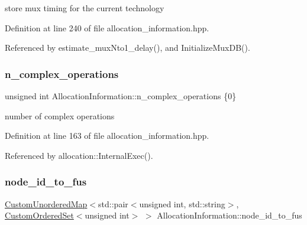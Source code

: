 store mux timing for the current technology 



Definition at line 240 of file allocation\+\_\+information.\+hpp.



Referenced by estimate\+\_\+mux\+Nto1\+\_\+delay(), and Initialize\+Mux\+D\+B().

\mbox{\label{classAllocationInformation_aaa957dd7b3b6bd358aa029dac21a18ef}} 
\subsubsection{\texorpdfstring{n\+\_\+complex\+\_\+operations}{n\_complex\_operations}}
{\footnotesize\ttfamily unsigned int Allocation\+Information\+::n\+\_\+complex\+\_\+operations \{0\}\hspace{0.3cm}{\ttfamily [private]}}



number of complex operations 



Definition at line 163 of file allocation\+\_\+information.\+hpp.



Referenced by allocation\+::\+Internal\+Exec().

\mbox{\label{classAllocationInformation_aa3c7326d3edf9247e81a30e79233f76d}} 
\subsubsection{\texorpdfstring{node\+\_\+id\+\_\+to\+\_\+fus}{node\_id\_to\_fus}}
{\footnotesize\ttfamily \hyperlink{custom__map_8hpp_ad1ed68f2ff093683ab1a33522b144adc}{Custom\+Unordered\+Map}$<$std\+::pair$<$unsigned int, std\+::string$>$, \hyperlink{classCustomOrderedSet}{Custom\+Ordered\+Set}$<$unsigned int$>$ $>$ Allocation\+Information\+::node\+\_\+id\+\_\+to\+\_\+fus\hspace{0.3cm}{\ttfamily [private]}}



